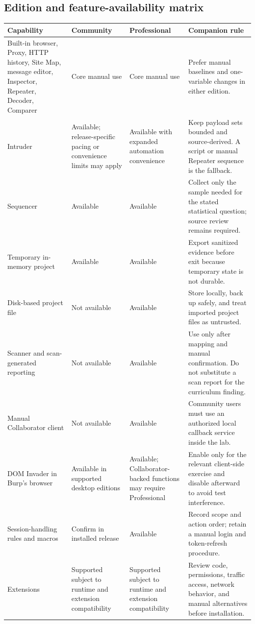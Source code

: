 \documentclass[11pt]{article}
\begin{document}
\subsection{Edition and feature-availability matrix}

\small
\begin{longtable}{@{}L{0.21\textwidth}L{0.17\textwidth}L{0.18\textwidth}L{0.34\textwidth}@{}}
\toprule
\textbf{Capability} & \textbf{Community} & \textbf{Professional} & \textbf{Companion rule} \\
\midrule
\endhead
Built-in browser, Proxy, HTTP history, Site Map, message editor, Inspector, Repeater, Decoder, Comparer & Core manual use & Core manual use & Prefer manual baselines and one-variable changes in either edition. \\
Intruder & Available; release-specific pacing or convenience limits may apply & Available with expanded automation convenience & Keep payload sets bounded and source-derived. A script or manual Repeater sequence is the fallback. \\
Sequencer & Available & Available & Collect only the sample needed for the stated statistical question; source review remains required. \\
Temporary in-memory project & Available & Available & Export sanitized evidence before exit because temporary state is not durable. \\
Disk-based project file & Not available & Available & Store locally, back up safely, and treat imported project files as untrusted. \\
Scanner and scan-generated reporting & Not available & Available & Use only after mapping and manual confirmation. Do not substitute a scan report for the curriculum finding. \\
Manual Collaborator client & Not available & Available & Community users must use an authorized local callback service inside the lab. \\
DOM Invader in Burp's browser & Available in supported desktop editions & Available; Collaborator-backed functions may require Professional & Enable only for the relevant client-side exercise and disable afterward to avoid test interference. \\
Session-handling rules and macros & Confirm in installed release & Available & Record scope and action order; retain a manual login and token-refresh procedure. \\
Extensions & Supported subject to runtime and extension compatibility & Supported subject to runtime and extension compatibility & Review code, permissions, traffic access, network behavior, and manual alternatives before installation. \\
\bottomrule
\end{longtable}
\normalsize
\end{document}
